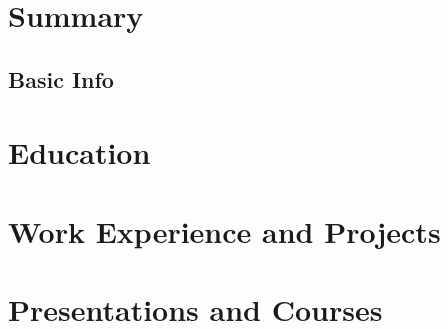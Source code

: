 \documentclass{cv}
\begin{document}
\section{Summary}
\subsection{Basic Info}
\section{Education}
\section{Work Experience and Projects}
\section{Presentations and Courses}
\end{document}
